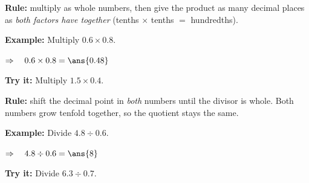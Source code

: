 \documentclass[12pt]{article}
\begin{document}

\begin{formulabox}
\textbf{Rule:} multiply as whole numbers, then give the product as many
decimal places as \emph{both factors have together} (tenths $\times$ tenths
$=$ hundredths).
\end{formulabox}

\begin{examplebox}
\textbf{Example:} \quad Multiply $0.6 \times 0.8$.

$\Rightarrow\quad 0.6 \times 0.8 = \ans{0.48}$
\end{examplebox}

\begin{tryitbox}
\textbf{Try it:} \quad Multiply $1.5 \times 0.4$.\\[2pt]
\end{tryitbox}


\begin{formulabox}
\textbf{Rule:} shift the decimal point in \emph{both} numbers until the
divisor is whole. Both numbers grow tenfold together, so the quotient stays
the same.
\end{formulabox}

\begin{examplebox}
\textbf{Example:} \quad Divide $4.8 \div 0.6$.

$\Rightarrow\quad 4.8 \div 0.6 = \ans{8}$
\end{examplebox}

\begin{tryitbox}
\textbf{Try it:} \quad Divide $6.3 \div 0.7$.\\[2pt]
\end{tryitbox}
\end{document}
